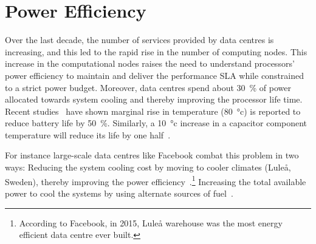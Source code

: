 \section{Power Efficiency}
\label{section: power efficiency}


 Over the last decade, the number of services provided by data centres is increasing, and
this led to the rapid rise in the number of computing nodes. This increase in the
computational nodes raises the need to understand processors' power efficiency to maintain
and deliver the performance SLA while constrained to a strict power budget.  Moreover,
data centres spend about \SI{30}{\percent} of power allocated towards system cooling and
thereby improving the processor life time. Recent studies~\citep{4544393,
Henkel:2016:TPR:2971808.2971810, Googledatacentre, Fisher:2009:TGR:1548886.1549641} have
shown marginal rise in temperature (\SI{80}{\degree}c) is reported to reduce battery life
by \SI{50}{\percent}. Similarly, a \SI{10}{\degree}c increase in a capacitor component
temperature will reduce its life by one half~\citep{4544393}. 

For instance large-scale data centres like Facebook combat this problem in two ways:
{\small {}} Reducing the system cooling cost by moving to cooler climates
(\textsf{Lule\aa, Sweden}), thereby improving the power
efficiency~\citep{FBsweden}.\footnote{According to Facebook, in 2015, \textsf{Lule\aa}
warehouse was the most energy efficient data centre ever built.} {\small {}}
Increasing the total available power to cool the systems by using alternate sources of
fuel~\citep{FacebookHttp://goo.gl/dKVnSB}. 



